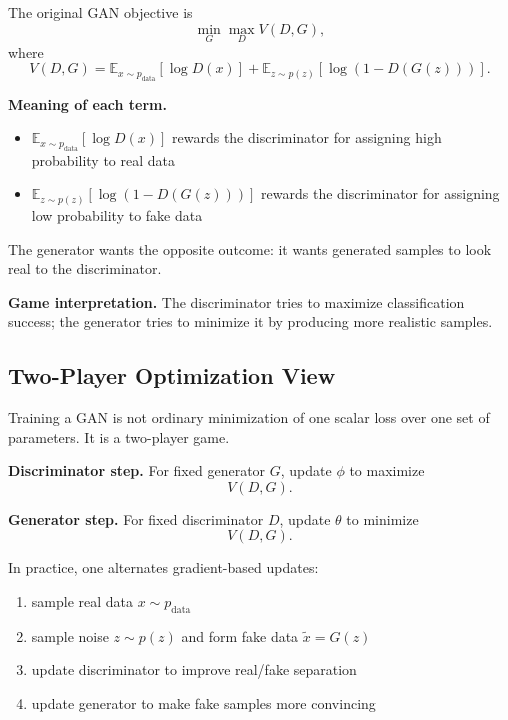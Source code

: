\noindent
The original GAN objective is
\[
\min_G \max_D V(D,G),
\]
where
\[
V(D,G)
=
\mathbb{E}_{x\sim p_{\text{data}}}[\log D(x)]
+
\mathbb{E}_{z\sim p(z)}[\log(1-D(G(z)))].
\]

\medskip

\noindent
\textbf{Meaning of each term.}

\begin{itemize}
    \item $\mathbb{E}_{x\sim p_{\text{data}}}[\log D(x)]$ rewards the discriminator for assigning high probability to real data
    \item $\mathbb{E}_{z\sim p(z)}[\log(1-D(G(z)))]$ rewards the discriminator for assigning low probability to fake data
\end{itemize}

\medskip

\noindent
The generator wants the opposite outcome: it wants generated samples to look real to the discriminator.

\medskip

\noindent
\textbf{Game interpretation.}
The discriminator tries to maximize classification success; the generator tries to minimize it by producing more realistic samples.

\subsection{Two-Player Optimization View}

Training a GAN is not ordinary minimization of one scalar loss over one set of parameters. It is a two-player game.

\medskip

\noindent
\textbf{Discriminator step.}
For fixed generator $G$, update $\phi$ to maximize
\[
V(D,G).
\]

\medskip

\noindent
\textbf{Generator step.}
For fixed discriminator $D$, update $\theta$ to minimize
\[
V(D,G).
\]

\medskip

\noindent
In practice, one alternates gradient-based updates:
\begin{enumerate}
    \item sample real data $x \sim p_{\text{data}}$
    \item sample noise $z \sim p(z)$ and form fake data $\tilde{x}=G(z)$
    \item update discriminator to improve real/fake separation
    \item update generator to make fake samples more convincing
\end{enumerate}

